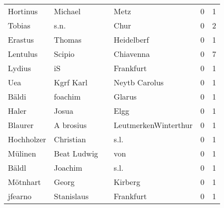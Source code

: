 \begin{tabular}{llllrr}
                 Hortinus &                            Michael &             &                                        Metz &          0 &         1 \\
                   Tobias &                               s.n. &             &                                        Chur &          0 &         2 \\
                  Erastus &                             Thomas &             &                                  Heidelberf &          0 &         1 \\
                 Lentulus &                             Scipio &             &                                   Chiavenna &          0 &         7 \\
                   Lydius &                                 iS &             &                                   Frankfurt &          0 &         1 \\
                      Uea &                          Kgrf Karl &             &                               Neytb Carolus &          0 &         1 \\
                    Bäldi &                            foachim &             &                                      Glarus &          0 &         1 \\
                    Haler &                              Josua &             &                                        Elgg &          0 &         1 \\
                  Blaurer &                          A brosius &             &                        LeutmerkenWinterthur &          0 &         1 \\
               Hochholzer &                          Christian &             &                                        s.l. &          0 &         1 \\
                  Mülinen &                        Beat Ludwig &             &                                         von &          0 &         1 \\
                    Bäldl &                            Joachim &             &                                        s.l. &          0 &         1 \\
                 Mötnhart &                              Georg &             &                                     Kirberg &          0 &         1 \\
                  jfearno &                         Stanislaus &             &                                   Frankfurt &          0 &         1 \\

\end{tabular}
